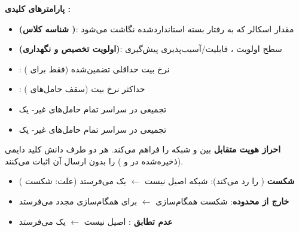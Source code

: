 \textbf{پارامترهای کلیدی :}

\begin{itemize}
\tightlist
\item
  \textbf{ (شناسه کلاس )}: مقدار اسکالر  که به رفتار بسته استانداردشده نگاشت می‌شود
\item
  \textbf{ (اولویت تخصیص و نگهداری)}: سطح اولویت ، قابلیت/\allowbreak{}آسیب‌پذیری پیش‌گیری
\item
  : نرخ بیت حداقلی تضمین‌شده (فقط برای )
\item
  : حداکثر نرخ بیت (سقف حامل‌های )
\item
   تجمیعی در سراسر تمام حامل‌های غیر- یک 
\item
   تجمیعی در سراسر تمام حامل‌های غیر- یک 
\end{itemize}




\CNchained{}

 \textbf{احراز هویت متقابل} بین  و شبکه را فراهم می‌کند. هر دو طرف دانش کلید دایمی  (ذخیره‌شده در  و ) را بدون ارسال آن اثبات می‌کنند.




\begin{itemize}
\tightlist
\item
  \textbf{شکست } ( را رد می‌کند): شبکه اصیل نیست \ensuremath{\leftarrow}  یک  می‌فرستد (علت: شکست )
\item
  \textbf{ خارج از محدوده}: شکست همگام‌سازی \ensuremath{\leftarrow}  برای همگام‌سازی مجدد  می‌فرستد
\item
  \textbf{عدم تطابق }:  اصیل نیست \ensuremath{\leftarrow}  یک  می‌فرستد
\end{itemize}

